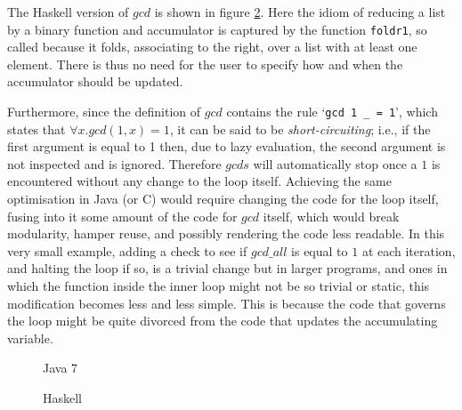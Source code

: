The Haskell version of $gcd$ is shown in figure \ref{fig:gcds:haskell}. Here the idiom
of reducing a list by a binary function and accumulator is captured
by the function \lstinline|foldr1|, so called because it folds,
associating to the right, over a list with at least one element. There is thus no 
need for the user to specify how and when the accumulator should be updated.

Furthermore, since the definition of $gcd$ contains the rule
`\lstinline|gcd 1 _ = 1|',
which states that $\forall x. gcd (1, x) = 1$, it can be said to be
\emph{short-circuiting}; i.e., if the first argument is equal to 1 then, due
to lazy evaluation, the second argument is not inspected and is ignored.
Therefore $gcds$ will automatically stop once a $1$ is encountered without any
change to the loop itself. Achieving the same optimisation in Java (or C) would
require changing the code for the loop itself, fusing into it some amount of the code
for $gcd$ itself, which would break
modularity, hamper reuse, and possibly rendering the code less readable. In this very small example, adding a check to see if $gcd\_all$ is equal to $1$ at each 
iteration, and halting the loop if so, is a trivial change but in larger programs, and ones in which the function inside the inner loop might not be so trivial or static,
this modification becomes less and less simple. This is because the code that governs the loop might be
quite divorced from the code that updates the accumulating variable.

\begin{figure}

\caption{Java 7}
\label{fig:gcds:java}
\end{figure}

%

\begin{figure}

\caption{Haskell}
\label{fig:gcds:haskell}
\end{figure}
